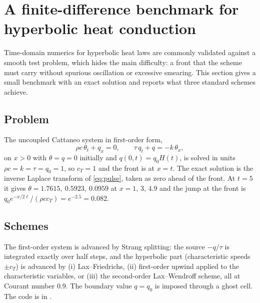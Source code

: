 \section{A finite-difference benchmark for hyperbolic heat conduction}\label{sec:schemes}

Time-domain numerics for hyperbolic heat laws are commonly validated against a smooth test problem, which hides the main difficulty: a front that the scheme must carry without spurious oscillation or excessive smearing. This section gives a small benchmark with an exact solution and reports what three standard schemes achieve.

\subsection{Problem}
The uncoupled Cattaneo system in first-order form,
\begin{equation}
\rho c\,\theta_t+q_x=0,\qquad \tau\,q_t+q=-k\,\theta_x ,
\end{equation}
on $x>0$ with $\theta=q=0$ initially and $q(0,t)=q_0H(t)$, is solved in units $\rho c=k=\tau=q_0=1$, so $c_T=1$ and the front is at $x=t$. The exact solution is the inverse Laplace transform of \cref{eq:pulse}, taken as zero ahead of the front. At $t=5$ it gives $\theta=1.7615,\ 0.5923,\ 0.0959$ at $x=1,\,3,\,4.9$ and the jump at the front is $q_0e^{-x/2\ell}/(\rho cc_T)=e^{-2.5}=0.082$.

\subsection{Schemes}
The first-order system is advanced by Strang splitting: the source $-q/\tau$ is integrated exactly over half steps, and the hyperbolic part (characteristic speeds $\pm c_T$) is advanced by (i) Lax--Friedrichs, (ii) first-order upwind applied to the characteristic variables, or (iii) the second-order Lax--Wendroff scheme, all at Courant number $0.9$. The boundary value $q=q_0$ is imposed through a ghost cell. The code is in .

